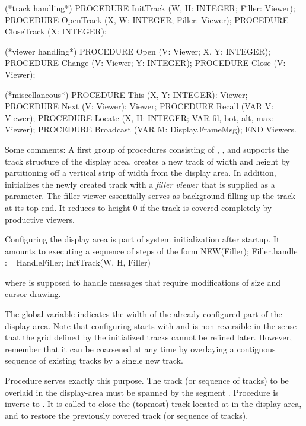   (*track handling*)
  PROCEDURE InitTrack (W, H: INTEGER; Filler: Viewer);
  PROCEDURE OpenTrack (X, W: INTEGER; Filler: Viewer);
  PROCEDURE CloseTrack (X: INTEGER);

  (*viewer handling*)
  PROCEDURE Open (V: Viewer; X, Y: INTEGER);
  PROCEDURE Change (V: Viewer; Y: INTEGER);
  PROCEDURE Close (V: Viewer);

  (*miscellaneous*)
  PROCEDURE This (X, Y: INTEGER): Viewer;
  PROCEDURE Next (V: Viewer): Viewer;
  PROCEDURE Recall (VAR V: Viewer);
  PROCEDURE Locate (X, H: INTEGER; VAR fil, bot, alt, max: Viewer);
  PROCEDURE Broadcast (VAR M: Display.FrameMsg);
END Viewers.
\endtt

\noindent Some comments: A first group of procedures consisting of , , and  supports the track structure of the display area.  creates a new track of width  and height  by partitioning off a vertical strip of width  from the display area. In addition,  initializes the newly created track with a \emph{filler viewer} that is supplied as a parameter. The filler viewer essentially serves as background filling up the track at its top end. It reduces to height 0 if the track is covered completely by productive viewers.

Configuring the display area is part of system initialization after
startup. It amounts to executing a sequence of steps of the form
\begintt
NEW(Filler); Filler.handle := HandleFiller; InitTrack(W, H, Filler)
\endtt

\noindent where  is supposed to handle messages
that require modifications of size and cursor drawing.

The global variable  indicates the width of the already configured
part of the display area. Note that configuring starts with  and
is non-reversible in the sense that the grid defined by the
initialized tracks cannot be refined later. However, remember that it
can be coarsened at any time by overlaying a contiguous sequence of
existing tracks by a single new track.

Procedure  serves exactly this purpose. The track (or
sequence of tracks) to be overlaid in the display-area must be spanned
by the segment \code{[X, X + W)\/}. Procedure  is inverse to
. It is called to close the (topmost) track located at  in
the display area, and to restore the previously covered track (or
sequence of tracks).

